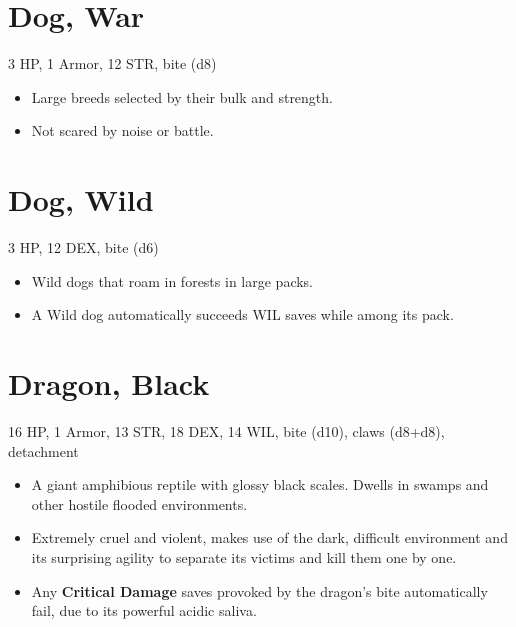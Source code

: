 \documentclass[
  10pt,
  american,
]{article}
\begin{document}
\hypertarget{dog-war}{%
\section{Dog, War}\label{dog-war}}

3 HP, 1 Armor, 12 STR, bite (d8)

\begin{samepage}
\begin{itemize}
\setlength\itemsep{-.5em}
\item Large breeds selected by their bulk and strength.
\item Not scared by noise or battle.
\end{itemize}
\end{samepage}

\hypertarget{dog-wild}{%
\section{Dog, Wild}\label{dog-wild}}

3 HP, 12 DEX, bite (d6)

\begin{samepage}
\begin{itemize}
\setlength\itemsep{-.5em}
\item Wild dogs that roam in forests in large packs.
\item A Wild dog automatically succeeds WIL saves while among its pack.
\end{itemize}
\end{samepage}

\hypertarget{dragon-black}{%
\section{Dragon, Black}\label{dragon-black}}

16 HP, 1 Armor, 13 STR, 18 DEX, 14 WIL, bite (d10), claws (d8+d8),
detachment

\begin{samepage}
\begin{itemize}
\setlength\itemsep{-.5em}
\item A giant amphibious reptile with glossy black scales. Dwells in swamps and other hostile flooded environments.
\item Extremely cruel and violent, makes use of the dark, difficult environment and its surprising agility to separate its victims and kill them one by one.
\item Any \textbf{Critical Damage} saves provoked by the dragon's bite automatically fail, due to its powerful acidic saliva.
\end{itemize}
\end{samepage}
\end{document}
